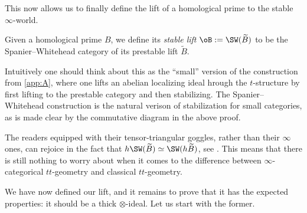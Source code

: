 This now allows us to finally define the lift of a homological prime to the stable $\infty$-world. 

\begin{definition}
    Given a homological prime $B$, we define its \emph{stable lift} $\oB := \SW(\widetilde{B})$ to be the Spanier--Whitehead category of its prestable lift $\widetilde{B}$. 
\end{definition}

\begin{remark}
    Intuitively one should think about this as the ``small'' version of the construction from \cref{app:A}, where one lifts an abelian localizing ideal hrough the $t$-structure by first lifting to the prestable category and then stabilizing. The Spanier--Whitehead construction is the natural verison of stabilization for small categories, as is made clear by the commutative diagram in the above proof. 
\end{remark}

\begin{remark}
    The readers equipped with their tensor-triangular goggles, rather than their $\infty$ ones, can rejoice in the fact that $h\SW(\widetilde{B})\simeq \SW(h\widetilde{B})$, see \cite[C.1.1.3]{lurie_SAG}. This means that there is still nothing to worry about when it comes to the difference between $\infty$-categorical $tt$-geometry and classical $tt$-geometry. 
\end{remark}

We have now defined our lift, and it remains to prove that it has the expected properties: it should be a thick $\otimes$-ideal. Let us start with the former. 

